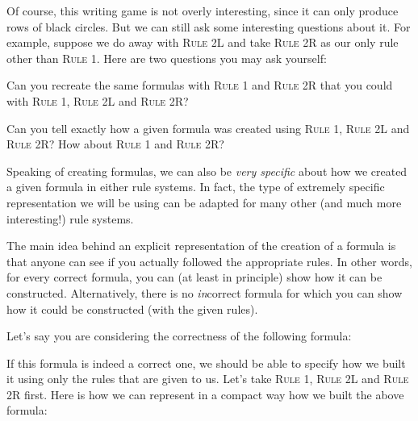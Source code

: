 Of course, this writing game is not overly interesting, since it can only produce rows of black circles. But we can still ask some interesting questions about it. For example, suppose we do away with \textsc{Rule 2L} and take \textsc{Rule 2R} as our only rule other than \textsc{Rule 1}. Here are two questions you may ask yourself:

\begin{exc}
Can you recreate the same formulas with \textsc{Rule 1} and \textsc{Rule 2R} that you could with \textsc{Rule 1}, \textsc{Rule 2L} and \textsc{Rule 2R}?
\end{exc}

\begin{exc}\label{unread}
Can you tell exactly how a given formula was created using \textsc{Rule 1}, \textsc{Rule 2L} and \textsc{Rule 2R}? How about \textsc{Rule 1} and \textsc{Rule 2R}?
\end{exc}

Speaking of creating formulas, we can also be \textit{very specific} about how we created a given formula in either rule systems. In fact, the type of extremely specific representation we will be using can be adapted for many other (and much more interesting!) rule systems. 

The main idea behind an explicit representation of the creation of a formula is that anyone can see if you actually followed the appropriate rules. In other words, for every correct formula, you can (at least in principle) show how it can be constructed. Alternatively, there is no \textit{in}correct formula for which you can show how it could be constructed (with the given rules). 

Let's say you are considering the correctness of the following formula: \begin{center}\bcirc\bcirc\bcirc\bcirc
\end{center}

If this formula is indeed a correct one, we should be able to specify how we built it using only the rules that are given to us. Let's take \textsc{Rule 1}, \textsc{Rule 2L} and \textsc{Rule 2R} first. Here is how we can represent in a compact way how we built the above formula:

\medskip
\begin{axiomatic}
\end{axiomatic}
\medskip

